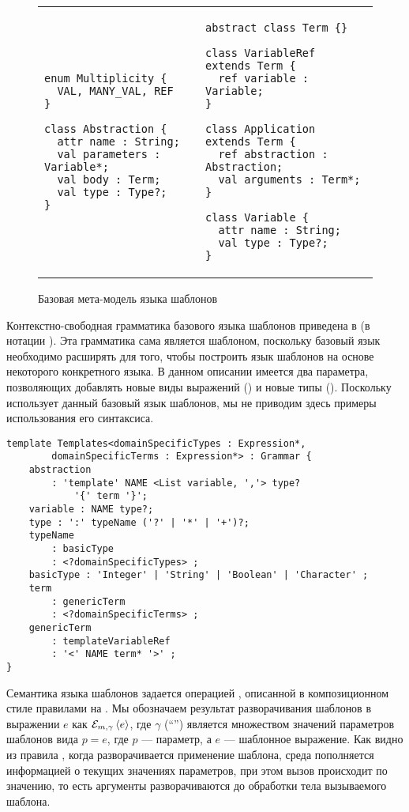 {\begin{figure}[htbp]
\begin{tabular}{p{}p{}}
\begin{lstlisting}[xleftmargin=0cm]
enum Multiplicity {
  VAL, MANY_VAL, REF
}

class Abstraction {
  attr name : String;
  val parameters : Variable*;
  val body : Term;
  val type : Type?;
}

\end{lstlisting}
&
\begin{lstlisting}[xleftmargin=0cm]
abstract class Term {}

class VariableRef extends Term {
  ref variable : Variable;
}

class Application extends Term {
  ref abstraction : Abstraction;
  val arguments : Term*;
}

class Variable {
  attr name : String;
  val type : Type?;
}
\end{lstlisting}
\end{tabular}
	\caption{Базовая мета-модель языка шаблонов}\label{TempMM}
\end{figure}

Контекстно-свободная грамматика базового языка шаблонов приведена в  (в нотации \GRM{}). Эта грамматика сама является шаблоном, поскольку базовый язык необходимо расширять для того, чтобы построить язык шаблонов на основе некоторого конкретного языка. В данном описании имеется два параметра, позволяющих добавлять новые виды выражений () и новые типы (). Поскольку \GRM{} использует данный базовый язык шаблонов, мы не приводим здесь примеры использования его синтаксиса.

\begin{lstlisting}[label=TempG,float=htbp,caption=Базовый синтаксис языка шаблонов]
template Templates<domainSpecificTypes : Expression*, 
		domainSpecificTerms : Expression*> : Grammar {
	abstraction 
		: 'template' NAME <List variable, ','> type? 
			'{' term '}';
	variable : NAME type?;
	type : ':' typeName ('?' | '*' | '+')?;
	typeName
		: basicType
		: <?domainSpecificTypes> ;
	basicType : 'Integer' | 'String' | 'Boolean' | 'Character' ;
	term
		: genericTerm
		: <?domainSpecificTerms> ;
	genericTerm
		: templateVariableRef
		: '<' NAME term* '>' ;
}
\end{lstlisting}

Семантика языка шаблонов задается операцией , описанной в композиционном стиле правилами на . Мы обозначаем результат разворачивания шаблонов в выражении $e$ как $\mathcal{E}_{m, \gamma} \left\langle e \right\rangle$, где $\gamma$ (``'') является множеством значений параметров шаблонов вида $p = e$, где $p$ --- параметр, а $e$ --- шаблонное выражение. Как видно из правила , когда разворачивается применение шаблона, среда пополняется информацией о текущих значениях параметров, при этом вызов происходит по значению, то есть аргументы разворачиваются до обработки тела вызываемого шаблона. 

}
